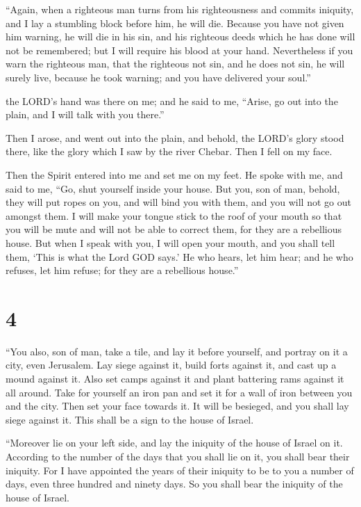  ``Again, when a righteous man turns from his righteousness
and commits iniquity, and I lay a stumbling block before him, he will
die. Because you have not given him warning, he will die in his sin, and
his righteous deeds which he has done will not be remembered; but I will
require his blood at your hand.  Nevertheless if you warn
the righteous man, that the righteous not sin, and he does not sin, he
will surely live, because he took warning; and you have delivered your
soul.''

 the LORD's hand was there on me; and he said to me,
``Arise, go out into the plain, and I will talk with you there.''

 Then I arose, and went out into the plain, and behold, the
LORD's glory stood there, like the glory which I saw by the river
Chebar. Then I fell on my face.

 Then the Spirit entered into me and set me on my feet. He
spoke with me, and said to me, ``Go, shut yourself inside your house.
 But you, son of man, behold, they will put ropes on you,
and will bind you with them, and you will not go out amongst them.
 I will make your tongue stick to the roof of your mouth so
that you will be mute and will not be able to correct them, for they are
a rebellious house.  But when I speak with you, I will open
your mouth, and you shall tell them, `This is what the Lord GOD says.'
He who hears, let him hear; and he who refuses, let him refuse; for they
are a rebellious house.''

\hypertarget{section-3}{%
\section{4}\label{section-3}}

 ``You also, son of man, take a tile, and lay it before
yourself, and portray on it a city, even Jerusalem.  Lay
siege against it, build forts against it, and cast up a mound against
it. Also set camps against it and plant battering rams against it all
around.  Take for yourself an iron pan and set it for a wall
of iron between you and the city. Then set your face towards it. It will
be besieged, and you shall lay siege against it. This shall be a sign to
the house of Israel.

 ``Moreover lie on your left side, and lay the iniquity of
the house of Israel on it. According to the number of the days that you
shall lie on it, you shall bear their iniquity.  For I have
appointed the years of their iniquity to be to you a number of days,
even three hundred and ninety days. So you shall bear the iniquity of
the house of Israel.

